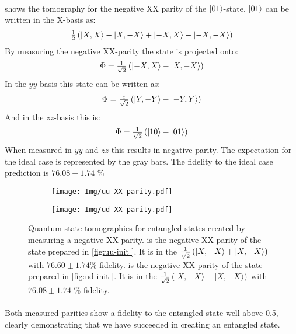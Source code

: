 \paragraph{ }
 shows the tomography for the negative XX parity of the ${\left\vert{01}\right\rangle}$-state.
${\left\vert{01}\right\rangle}$ can be written in the X-basis as:
\begin{equation}
    \tfrac{1}{2} \left( {\left\vert{X,X}\right\rangle} - {\left\vert{X,-X}\right\rangle} +{\left\vert{-X,X}\right\rangle} - {\left\vert{-X,-X}\right\rangle} \right)
 \end{equation}
By measuring the negative XX-parity the state is projected onto:
\begin{equation}
    \Phi = \tfrac{1}{\sqrt{2}} \left( {\left\vert{-X,X}\right\rangle} -{\left\vert{X,-X}\right\rangle} \right)
\end{equation}
In the $yy$-basis this state can be written as:
\begin{equation}
    \Phi = \tfrac{i}{\sqrt{2}} \left( {\left\vert{Y,-Y}\right\rangle} -{\left\vert{-Y,Y}\right\rangle} \right)
\end{equation}
And in the $zz$-basis this is:
\begin{equation}
    \Phi = \tfrac{1}{\sqrt{2}} \left( {\left\vert{10}\right\rangle} -{\left\vert{01}\right\rangle} \right)
\end{equation}
When measured in $yy$ and $zz$ this results in negative parity.
The expectation for the ideal case is represented by the gray bars.
The fidelity to the ideal case prediction is  $76.08 \pm 1.74$ \%


\begin{figure}[htbp]
    \begin{subfigure}[t]{0.49\textwidth}\centering
        \caption{}
        \texttt{[image: Img/uu-XX-parity.pdf]}
        \label{fig:uu-XX}
    \end{subfigure}
    \begin{subfigure}[t]{0.49\textwidth}\centering
        \caption{}
        \texttt{[image: Img/ud-XX-parity.pdf]}
        \label{fig:ud-XX}
    \end{subfigure}
    \caption{ Quantum state tomographies for entangled states created by measuring a negative XX parity.
     is the negative XX-parity of the state prepared in \cref{fig:uu-init }. It is in the $    \tfrac{1}{\sqrt{2}} \left( {\left\vert{X,-X}\right\rangle} +{\left\vert{X,-X}\right\rangle} \right)
$ with  $76.60 \pm 1.74\%$ fidelity.
     is the negative XX-parity of the state prepared in \cref{fig:ud-init }. It is in the $\tfrac{1}{\sqrt{2}} \left( {\left\vert{X,-X}\right\rangle} -{\left\vert{X,-X}\right\rangle} \right)$  with  $76.08 \pm 1.74$ \% fidelity.
    }
    \label{fig:2qubit_parity_Tomos}
\end{figure}

\paragraph{ }
Both measured parities show a fidelity to the entangled state well above 0.5, clearly demonstrating that we have succeeded in creating an entangled state.

